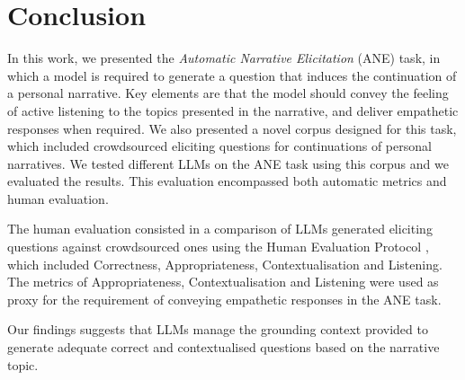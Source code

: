 \chapter{Conclusion}
\label{cha:conclusion}
In this work, we presented the \emph{Automatic Narrative Elicitation} (ANE) task, in which a model is required to generate a question that induces the continuation of a personal narrative. Key elements are that the model should convey the feeling of active listening to the topics presented in the narrative, and deliver empathetic responses when required. We also presented a novel corpus designed for this task, which included crowdsourced eliciting questions for continuations of personal narratives. We tested different LLMs on the ANE task using this corpus and we evaluated the results. This evaluation encompassed both automatic metrics and human evaluation. 

The human evaluation consisted in a comparison of LLMs generated eliciting questions against crowdsourced ones using the Human Evaluation Protocol \cite{mousavi-etal-2022-evaluation}, which included Correctness, Appropriateness, Contextualisation and Listening. The metrics of Appropriateness, Contextualisation and Listening were used as proxy for the requirement of conveying empathetic responses in the ANE task.

Our findings suggests that LLMs manage the grounding context provided  to generate adequate correct and contextualised questions based on the narrative topic. 

